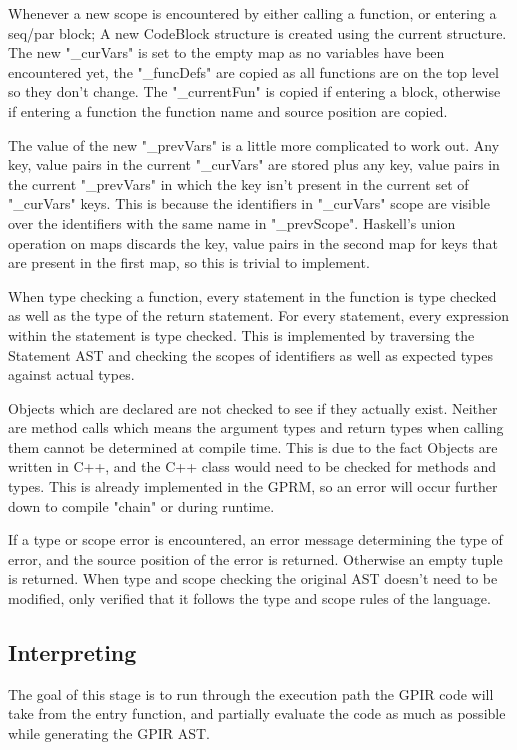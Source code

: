 Whenever a new scope is encountered by either calling a function, or entering a seq/par block;
A new CodeBlock structure is created using the current structure. The new "\_curVars"
is set to the empty map as no variables have been encountered yet, the "\_funcDefs"
are copied as all functions are on the top level so they don't change. The "\_currentFun"
is copied if entering a block, otherwise if entering a function the function name
and source position are copied. 

The value of the new "\_prevVars" is a little more complicated to work out.
Any key, value pairs in the current "\_curVars" are stored plus any key, value
pairs in the current "\_prevVars" in which the key isn't present in the current 
set of "\_curVars" keys. This is because
the identifiers in "\_curVars" scope are visible over the identifiers with
the same name in "\_prevScope". Haskell's union operation on maps
discards the key, value pairs in the second map for keys that are
present in the first map, so this is trivial to implement.

When type checking a function, every statement in the function is type checked
as well as the type of the return statement. For every statement,
every expression within the statement is type checked. This is implemented by traversing
the Statement AST and checking the scopes of identifiers as well as expected types
against actual types.

Objects which are declared are not checked to see if they actually exist. Neither
are method calls which means the argument types and return types when calling them
cannot be determined at compile time. This is due to the fact Objects are written
in C++, and the C++ class would need to be checked for methods and types. This is already
implemented in the GPRM, so an error will occur further down to compile "chain" or during
runtime.

If a type or scope error is encountered, an error message determining the type of error,
and the source position of the error is returned. Otherwise an empty tuple is returned.
When type and scope checking the original AST doesn't need to be modified, only verified
that it follows the type and scope rules of the language.


\subsection{Interpreting}

The goal of this stage is to run through the execution path the GPIR code
will take from the entry function, and partially evaluate the code as much
as possible while generating the GPIR AST.

